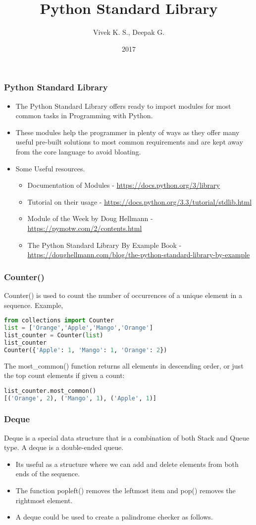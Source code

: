 \documentclass{beamer}
\title{Python Standard Library}
\author{Vivek K. S., Deepak G.}
\institute{Information Systems Decision Sciences (ISDS)\\
MUMA College of Business\\
University of South Florida \\
Tampa, Florida}
\date{2017}
\begin{document}
\frame{\titlepage}

\begin{frame}[fragile]
\frametitle{Python Standard Library}
\begin{itemize}
\item The Python Standard Library offers ready to import modules for most common tasks in Programming with Python.
\item These modules help the programmer in plenty of ways as they offer many useful pre-built solutions to most common requirements and are kept away from the core language to avoid bloating.
\item Some Useful resources.
\begin{itemize}
\item Documentation of Modules - \url{https://docs.python.org/3/library}
\item Tutorial on their usage - \url{https://docs.python.org/3.3/tutorial/stdlib.html}
\item Module of the Week by Doug
Hellmann - \url{https://pymotw.com/2/contents.html}
\item The Python Standard Library By Example Book - \url{https://doughellmann.com/blog/the-python-standard-library-by-example}
\end{itemize}
\end{itemize}
\end{frame}

\begin{frame}[fragile]
\frametitle{Counter()}
Counter() is used to count the number of occurrences of a unique element in a sequence.
Example,
\begin{lstlisting}[language=Python]
from collections import Counter
list = ['Orange','Apple','Mango','Orange']
list_counter = Counter(list)
list_counter
Counter({'Apple': 1, 'Mango': 1, 'Orange': 2})
\end{lstlisting}
The most\_common() function returns all elements in descending order, or just the top
count elements if given a count:
\begin{lstlisting}[language=Python]
list_counter.most_common()
[('Orange', 2), ('Mango', 1), ('Apple', 1)]
\end{lstlisting}
\end{frame}

\begin{frame}
\frametitle{Deque}
Deque is a special data structure that is a combination of both Stack and Queue type. A deque is a double-ended queue. 
\begin{itemize}

\item Its useful as a structure where we can add and delete elements from both ends of the sequence.
\item The function popleft() removes the leftmost item and pop() removes the rightmost element.
\item A deque could be used to create a palindrome checker as follows.
\end{itemize}
\end{frame}
\end{document}
